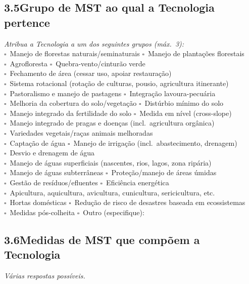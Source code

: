 \subsection{3.5\quad Grupo de MST ao qual a Tecnologia pertence}
\textit{Atribua a Tecnologia a um dos seguintes grupos (máx.\ 3):}\\[4pt]
$\square$~Manejo de florestas naturais/seminaturais \quad $\square$~Manejo de plantações florestais\\
$\square$~Agrofloresta \quad $\square$~Quebra-vento/cinturão verde\\
$\square$~Fechamento de área (cessar uso, apoiar restauração)\\
$\square$~Sistema rotacional (rotação de culturas, pousio, agricultura itinerante)\\
$\square$~Pastoralismo e manejo de pastagens \quad $\square$~Integração lavoura-pecuária\\
$\square$~Melhoria da cobertura do solo/vegetação \quad $\square$~Distúrbio mínimo do solo\\
$\square$~Manejo integrado da fertilidade do solo \quad $\square$~Medida em nível (cross-slope)\\
$\square$~Manejo integrado de pragas e doenças (incl.\ agricultura orgânica)\\
$\square$~Variedades vegetais/raças animais melhoradas\\
$\square$~Captação de água \quad $\square$~Manejo de irrigação (incl.\ abastecimento, drenagem)\\
$\square$~Desvio e drenagem de água\\
$\square$~Manejo de águas superficiais (nascentes, rios, lagos, zona ripária)\\
$\square$~Manejo de águas subterrâneas \quad $\square$~Proteção/manejo de áreas úmidas\\
$\square$~Gestão de resíduos/efluentes \quad $\square$~Eficiência energética\\
$\square$~Apicultura, aquicultura, avicultura, cunicultura, sericicultura, etc.\\
$\square$~Hortas domésticas \quad $\square$~Redução de risco de desastres baseada em ecossistemas\\
$\square$~Medidas pós-colheita \quad $\square$~Outro (especifique): \dotfill

\subsection{3.6\quad Medidas de MST que compõem a Tecnologia}
\textit{Várias respostas possíveis.}

